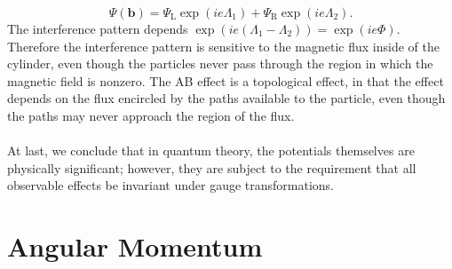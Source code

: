 \[\Psi(\bm{b}) = \Psi_{\mathrm{L}}\exp(ie\Lambda_1) + \Psi_{\mathrm{R}}\exp(ie\Lambda_2).\]
The interference pattern depends $\exp(ie(\Lambda_1-\Lambda_2)) = \exp(ie\Phi)$. 
Therefore the interference pattern is sensitive to the magnetic flux inside of the cylinder, even though the particles never pass through the region in which the magnetic field is nonzero. 
The AB effect is a topological effect, in that the effect depends on the flux encircled by the paths available to the particle, even though the paths may never approach the region of the flux. 
\\ \\
At last, we conclude that in quantum theory, the potentials themselves are physically significant; however, they are subject to the requirement that all observable effects be invariant under gauge transformations.

\chapter{Angular Momentum}
